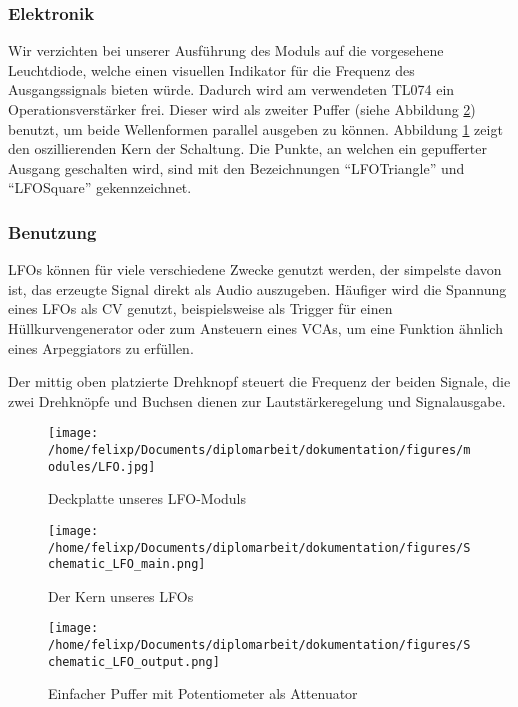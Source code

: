 \subsubsection{Elektronik}
\label{sec:org05dde7b}
Wir verzichten bei unserer Ausführung des Moduls auf die vorgesehene Leuchtdiode, welche einen visuellen Indikator für die Frequenz des Ausgangssignals bieten würde. Dadurch wird am verwendeten TL074 ein Operationsverstärker frei. Dieser wird als zweiter Puffer (siehe Abbildung \ref{fig:orgdecfe02}) benutzt, um beide Wellenformen parallel ausgeben zu können. Abbildung \ref{fig:org3054839} zeigt den oszillierenden Kern der Schaltung. Die Punkte, an welchen ein gepufferter Ausgang geschalten wird, sind mit den Bezeichnungen "`LFO\textunderscore Triangle"' und "`LFO\textunderscore Square"' gekennzeichnet.

\subsubsection{Benutzung}
\label{sec:org0f1592f}
\acp{LFO} können für viele verschiedene Zwecke genutzt werden, der simpelste davon ist, das erzeugte Signal direkt als Audio auszugeben. Häufiger wird die Spannung eines \ac{LFO}s als \acl{CV} genutzt, beispielsweise als Trigger für einen Hüllkurvengenerator oder zum Ansteuern eines \acp{VCA}, um eine Funktion ähnlich eines Arpeggiators zu erfüllen.

Der mittig oben platzierte Drehknopf steuert die Frequenz der beiden Signale, die zwei Drehknöpfe und Buchsen dienen zur Lautstärkeregelung und Signalausgabe.

\begin{figure}[hp]
\centering
\texttt{[image: /home/felixp/Documents/diplomarbeit/dokumentation/figures/modules/LFO.jpg]}
\caption{Deckplatte unseres LFO-Moduls}
\end{figure}

\begin{figure}[hp]
\centering
\texttt{[image: /home/felixp/Documents/diplomarbeit/dokumentation/figures/Schematic\_LFO\_main.png]}
\caption{\label{fig:org3054839}Der Kern unseres LFOs}
\end{figure}

\begin{figure}[hp]
\centering
\texttt{[image: /home/felixp/Documents/diplomarbeit/dokumentation/figures/Schematic\_LFO\_output.png]}
\caption{\label{fig:orgdecfe02}Einfacher Puffer mit Potentiometer als Attenuator}
\end{figure}


